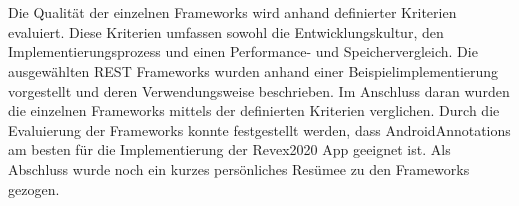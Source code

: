 \\\\
Die Qualität der einzelnen Frameworks wird anhand definierter Kriterien evaluiert. Diese Kriterien umfassen sowohl die Entwicklungskultur, den Implementierungsprozess und einen Performance- und Speichervergleich. Die ausgewählten REST Frameworks wurden anhand einer Beispielimplementierung vorgestellt und deren Verwendungsweise beschrieben. Im Anschluss daran wurden die einzelnen Frameworks mittels der definierten Kriterien verglichen. Durch die Evaluierung der Frameworks konnte festgestellt werden, dass AndroidAnnotations am besten für die Implementierung der Revex2020 App geeignet ist. Als Abschluss wurde noch ein kurzes persönliches Resümee zu den Frameworks gezogen.
